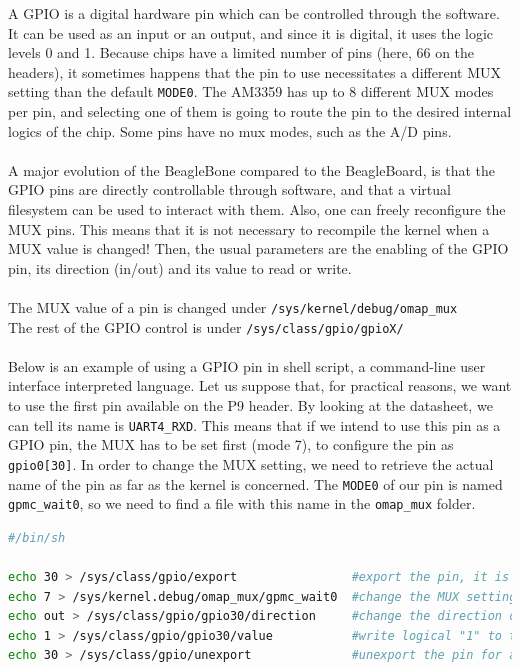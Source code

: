 A GPIO is a digital hardware pin which can be controlled through the software. It can be used as an input or an output, and since it is digital, it uses the logic levels 0 and 1. Because chips have a limited number of pins (here, 66 on the headers), it sometimes happens that the pin to use necessitates a different MUX setting than the default \verb!MODE0!. The AM3359 has up to 8 different MUX modes per pin, and selecting one of them is going to route the pin to the desired internal logics of the chip. Some pins have no mux modes, such as the A/D pins.
\\
\\
A major evolution of the BeagleBone compared to the BeagleBoard, is that the GPIO pins are directly controllable through software, and that a virtual filesystem can be used to interact with them. Also, one can freely reconfigure the MUX pins. This means that it is not necessary to recompile the kernel when  a MUX value is changed! Then, the usual parameters are the enabling of the GPIO pin, its direction (in/out) and its value to read or write.
\\
\\
The MUX value of a pin is changed under \verb!/sys/kernel/debug/omap_mux!
\\
The rest of the GPIO control is under \verb!/sys/class/gpio/gpioX/!
\\
\\
Below is an example of using a GPIO pin in shell script, a command-line user interface interpreted language. Let us suppose that, for practical reasons, we want to use the first pin available on the P9 header. By looking at the datasheet, we can tell its name is \verb!UART4_RXD!. This means that if we intend to use this pin as a GPIO pin, the MUX has to be set first (mode 7), to configure the pin as \verb!gpio0[30]!. In order to change the MUX setting, we need to retrieve the actual name of the pin as far as the kernel is concerned. The \verb!MODE0! of our pin is named \verb!gpmc_wait0!, so we need to find a file with this name in the \verb!omap_mux! folder.
\\
\begin{lstlisting}[language=sh, basicstyle=\scriptsize]
#/bin/sh

echo 30 > /sys/class/gpio/export                #export the pin, it is now usable
echo 7 > /sys/kernel.debug/omap_mux/gpmc_wait0  #change the MUX setting to 7 (gpio mode)
echo out > /sys/class/gpio/gpio30/direction     #change the direction of the pin
echo 1 > /sys/class/gpio/gpio30/value           #write logical "1" to the pin!
echo 30 > /sys/class/gpio/unexport              #unexport the pin for a clean exit
\end{lstlisting}

